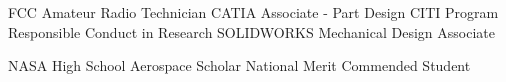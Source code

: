 \documentclass[letterpaper,ddMMMyyyy,nonstopmode]{simpleresumecv}
\newcommand{\tableWidth}{23.5em}
\begin{document}
\begin{Body}
\begin{tabular}[t]{p{11em} p{\tableWidth}}
            \end{tabular} %


		    \Entry FCC Amateur Radio Technician
		    \Entry CATIA Associate - Part Design
		    \Entry CITI Program Responsible Conduct in Research
		    \Entry SOLIDWORKS Mechanical Design Associate



		    \Entry NASA High School Aerospace Scholar
		    \Entry National Merit Commended Student
	\end{Body}
\end{document}
